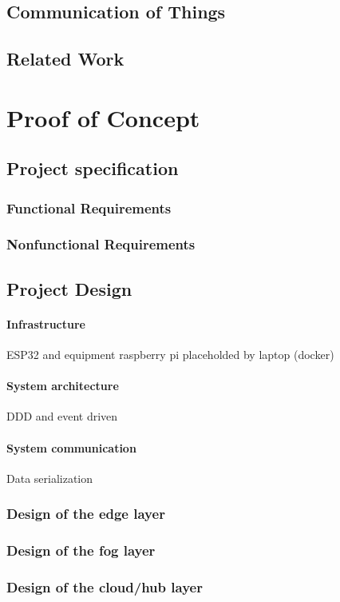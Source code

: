 \documentclass[
12pt,        %
openright,   %
twoside,     %
a4paper,     %
brazil,       %
english       %
%
%
]{ppgca}
\begin{document}
\section{Communication of Things}
\section{Related Work}


\chapter{Proof of Concept}
\section{Project specification}
\subsection{Functional Requirements}
\subsection{Nonfunctional Requirements}
\section{Project Design}
\subsubsection{Infrastructure}
ESP32 and equipment
raspberry pi placeholded by laptop (docker)
\subsubsection{System architecture}
DDD and event driven
\subsubsection{System communication}
Data serialization
\subsection{Design of the edge layer}
\subsection{Design of the fog layer}
\subsection{Design of the cloud/hub layer}
\end{document}
